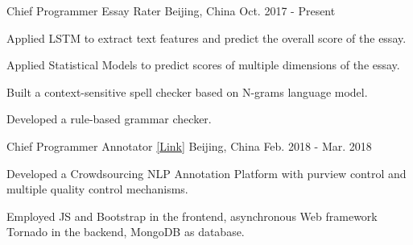 

\begin{cventries}

  \cventry
    {Chief Programmer} %
    {Essay Rater} %
    {Beijing, China} %
    {Oct. 2017 - Present} %
    {
      \begin{cvitems} %
        \item {Applied LSTM to extract text features and predict the overall score of the essay.}
        \item {Applied Statistical Models to predict scores of multiple dimensions of the essay.}
        \item {Built a context-sensitive spell checker based on N-grams language model.}
        \item {Developed a rule-based grammar checker.}
      \end{cvitems}
    }

  \cventry
    {Chief Programmer} %
    {Annotator \href{http://mark.17zuoye.net/}{[\underline{Link}]}} %
    {Beijing, China} %
    {Feb. 2018 - Mar. 2018} %
    {
      \begin{cvitems} %
        \item {Developed a Crowdsourcing NLP Annotation Platform with purview control and multiple quality control mechanisms.}
        \item {Employed JS and Bootstrap in the frontend, asynchronous Web framework Tornado in the backend, MongoDB as database.}
      \end{cvitems}
    }



\end{cventries}
